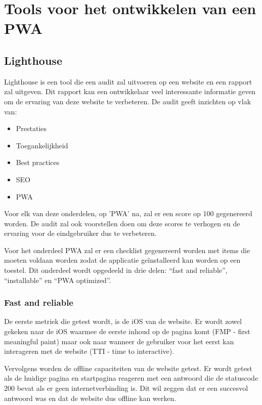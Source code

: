 \clearpage
\section{Tools voor het ontwikkelen van een PWA}


\subsection{Lighthouse}

	Lighthouse is een tool die een audit zal uitvoeren op een website en een rapport zal uitgeven. Dit rapport kan een ontwikkelaar veel interessante informatie geven om de ervaring van deze website te verbeteren. De audit geeft inzichten op vlak van:
	
	\begin{itemize}
		\item	Prestaties
		\item	Toegankelijkheid
		\item	Best practices
		\item	SEO
		\item   PWA
	\end{itemize}
	
	\autocite{Lighthouse2020}
	
	Voor elk van deze onderdelen, op 'PWA' na, zal er een score op 100 gegenereerd worden. De audit zal ook voorstellen doen om deze scores te verhogen en de ervaring voor de eindgebruiker dus te verbeteren.
	
	Voor het onderdeel PWA zal er een checklist gegenereerd worden met items die moeten voldaan worden zodat de applicatie geïnstalleerd kan worden op een toestel. Dit onderdeel wordt opgedeeld in drie delen: “fast and reliable”, “installable” en “PWA optimized”.
	
	
	\subsubsection{Fast and reliable}
		De eerste metriek die getest wordt, is de iOS van de website. Er wordt zowel gekeken naar de iOS waarmee de eerste inhoud op de pagina komt (FMP - first meaningful paint) maar ook naar wanneer de gebruiker voor het eerst kan interageren met de website (TTI - time to interactive).
		\autocite{web.dev2020}
		
		Vervolgens worden de offline capaciteiten van de website getest. Er wordt getest als de huidige pagina en startpagina reageren met een antwoord die de statuscode 200 bevat als er geen internetverbinding is. Dit wil zeggen dat er een succesvol antwoord was en dat de website dus offline kan werken.
	
